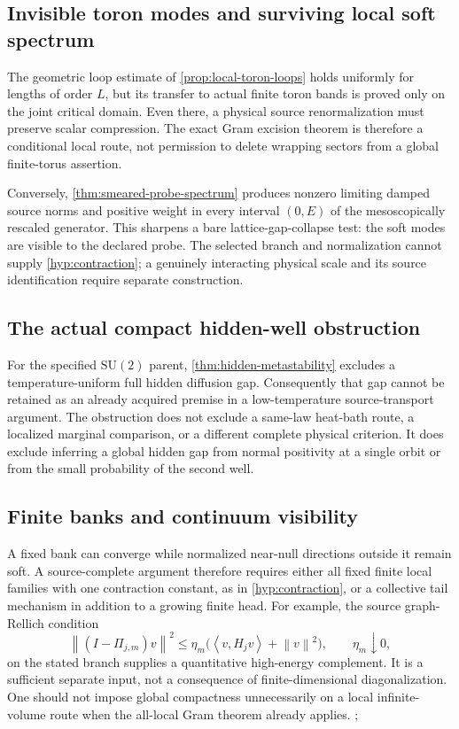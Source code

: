\documentclass[11pt,oneside,openany]{book}
\theoremstyle{definition}
\theoremstyle{remark}
\newcommand{\SU}{\mathrm{SU}}
\newcommand{\norm}[1]{\left\lVert#1\right\rVert}
\newcommand{\ip}[2]{\left\langle#1,#2\right\rangle}
\newcommand{\src}[2]{\cite[#2]{#1}}
\begin{document}
\subsection{Invisible toron modes and surviving local soft spectrum}
The geometric loop estimate of \cref{prop:local-toron-loops} holds
uniformly for lengths of order $L$, but its transfer to actual finite
toron bands is proved only on the joint critical domain. Even there,
a physical source renormalization must preserve scalar compression.
The exact Gram excision theorem is therefore a conditional local
route, not permission to delete wrapping sectors from a global
finite-torus assertion.

Conversely, \cref{thm:smeared-probe-spectrum} produces nonzero
limiting damped source norms and positive weight in every interval
$(0,E)$ of the mesoscopically rescaled generator. This sharpens a
bare lattice-gap-collapse test: the soft modes are visible to the
declared probe. The selected branch and normalization cannot supply
\cref{hyp:contraction}; a genuinely interacting physical scale and
its source identification require separate construction.

\subsection{The actual compact hidden-well obstruction}
For the specified $\SU(2)$ parent, \cref{thm:hidden-metastability}
excludes a temperature-uniform full hidden diffusion gap. Consequently
that gap cannot be retained as an already acquired premise in a
low-temperature source-transport argument. The obstruction does not
exclude a same-law heat-bath route, a localized marginal comparison,
or a different complete physical criterion. It does exclude inferring
a global hidden gap from normal positivity at a single orbit or from
the small probability of the second well.

\subsection{Finite banks and continuum visibility}
A fixed bank can converge while normalized near-null directions outside it remain soft. A source-complete argument therefore requires either all fixed finite local families with one contraction constant, as in \cref{hyp:contraction}, or a collective tail mechanism in addition to a growing finite head. For example, the source graph-Rellich condition
\[
\norm{(I-\Pi_{j,m})v}^2
\le\eta_m\bigl(\ip{v}{H_jv}+\norm v^2\bigr),\qquad\eta_m\downarrow0,
\]
on the stated branch supplies a quantitative high-energy complement. It is a sufficient separate input, not a consequence of finite-dimensional diagonalization. One should not impose global compactness unnecessarily on a local infinite-volume route when the all-local Gram theorem already applies. \cite{GT}; \src{F1}{V1--V5}
\end{document}

